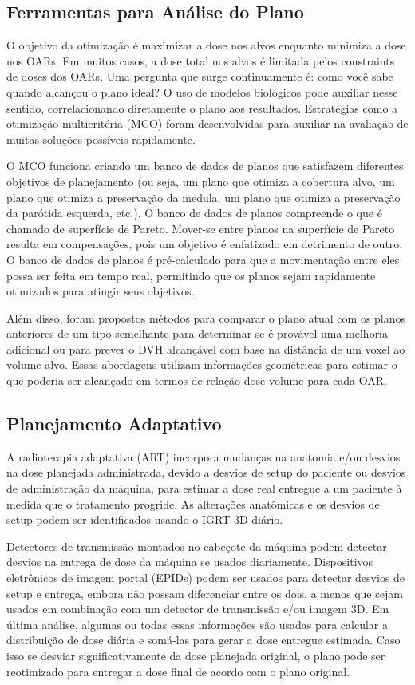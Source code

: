 \documentclass[11pt,a4paper]{article}
\begin{document}
\subsection*{Ferramentas para Análise do Plano}

	O objetivo da otimização é maximizar a dose nos alvos enquanto minimiza a dose nos OARs. Em muitos casos, a dose total nos alvos é limitada pelos constraints de doses dos OARs. Uma pergunta que surge continuamente é: como você sabe quando alcançou o plano ideal? O uso de modelos biológicos pode auxiliar nesse sentido, correlacionando diretamente o plano aos resultados. Estratégias como a otimização multicritéria (MCO) foram desenvolvidas para auxiliar na avaliação de muitas soluções possíveis rapidamente. 
	
	O MCO funciona criando um banco de dados de planos que satisfazem diferentes objetivos de planejamento (ou seja, um plano que otimiza a cobertura alvo, um plano que otimiza a preservação da medula, um plano que otimiza a preservação da parótida esquerda, etc.). O banco de dados de planos compreende o que é chamado de superfície de Pareto. Mover-se entre planos na superfície de Pareto resulta em compensações, pois um objetivo é enfatizado em detrimento de outro. O banco de dados de planos é pré-calculado para que a movimentação entre eles possa ser feita em tempo real, permitindo que  os planos sejam rapidamente otimizados para atingir seus objetivos. 
	
	Além disso, foram propostos métodos para comparar o plano atual com os planos anteriores de um tipo semelhante para determinar se é provável uma melhoria adicional ou para prever o DVH alcançável com base na distância de um voxel ao volume alvo. Essas abordagens utilizam informações geométricas para estimar o que poderia ser alcançado em termos de relação dose-volume para cada OAR.

\subsection*{Planejamento Adaptativo}

	A radioterapia adaptativa (ART) incorpora mudanças na anatomia e/ou desvios na dose planejada administrada, devido a desvios de setup do paciente ou desvios de administração da máquina, para estimar a dose real entregue a um paciente à medida que o tratamento progride. As alterações anatômicas e os desvios de setup podem ser identificados usando o IGRT 3D diário.
	
	Detectores de transmissão montados no cabeçote da máquina podem detectar desvios na entrega de dose da máquina se usados diariamente. Dispositivos eletrônicos de imagem portal (EPIDs) podem ser usados para detectar desvios de setup e entrega, embora não possam diferenciar entre os dois, a menos que sejam usados em combinação com um detector de transmissão e/ou imagem 3D. Em última análise, algumas ou todas essas informações são usadas para calcular a distribuição de dose diária e somá-las para gerar a dose entregue estimada. Caso isso se desviar significativamente da dose planejada original, o plano pode ser reotimizado para entregar a dose final de acordo com o plano original.
	
\end{document}
